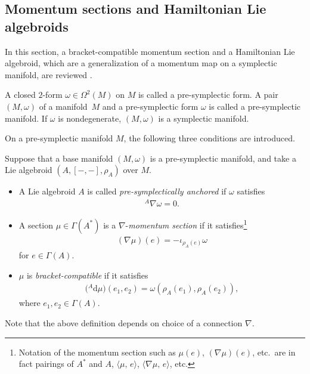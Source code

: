 \documentclass[10pt,a4paper]{amsart}
\numberwithin{equation}{section}
\newcommand{\rhoa}{{\rho_A}}
\newcommand{\bracket}[2]{\langle #1,\,#2\rangle}
\newcommand{\rd}{\mathrm{d}}
\newcommand{\anabla}{{{}^A \nabla}}
\begin{document}
\subsection{Momentum sections and Hamiltonian Lie algebroids}\label{MSHLA}
In this section, a bracket-compatible momentum section and a Hamiltonian Lie
algebroid, which are a generalization of a momentum map on a symplectic
manifold, are reviewed \cite{Blohmann:2023,Blohmann:2018}.

A closed $2$-form $\omega \in \Omega^2(M)$ on $M$ is called a pre-symplectic form. A pair $(M, \omega)$ of a manifold~$M$ and a pre-symplectic form $\omega$ is called a pre-symplectic manifold. If $\omega$ is nondegenerate, $(M, \omega)$ is a symplectic manifold.

On a pre-symplectic manifold $M$, the following three conditions are introduced.

\begin{Definition}\label{momsymp}
Suppose that a base manifold $(M, \omega)$ is a pre-symplectic manifold, and
take a Lie algebroid $(A, [-,-], \rhoa)$ over $M$.
\begin{itemize}\itemsep=0pt
\item[(S1)] A Lie algebroid $A$ is called \textit{pre-symplectically anchored} if $\omega$ satisfies
\begin{gather}
\anabla \omega =0.\label{HH1}
\end{gather}
\item[(S2)] A section $\mu \in \Gamma(A^*)$ is a $\nabla$-\textit{momentum section} if it satisfies\footnote{Notation of the momentum section such as $\mu(e)$, $(\nabla \mu)(e)$, etc.~are in fact pairings of $A^*$ and $A$, $\bracket{\mu}{e}$, $\bracket{\nabla \mu}{e}$, etc.}
\begin{gather}
(\nabla \mu)(e) = - \iota_{\rhoa(e)} \omega\label{HH2}
\end{gather}
for $e \in \Gamma(A)$.
\item[(S3)] $\mu$ is \textit{bracket-compatible} if it satisfies
\begin{gather}
\bigl({}^A \rd \mu\bigr)(e_1, e_2) = \omega(\rhoa(e_1), \rhoa(e_2)),
\label{HH3}
\end{gather}
where $e_1, e_2 \in \Gamma(A)$.
\end{itemize}
\end{Definition}
Note that the above definition depends on choice of a connection $\nabla$.
\end{document}
